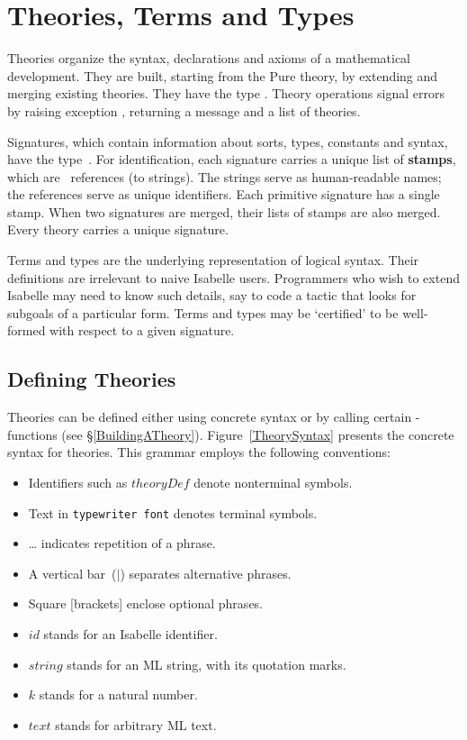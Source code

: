 \chapter{Theories, Terms and Types} \label{theories}
Theories organize the syntax, declarations and axioms of a mathematical
development.  They are built, starting from the Pure theory, by extending
and merging existing theories.  They have the \ML{} type .
Theory operations signal errors by raising exception ,
returning a message and a list of theories.

Signatures, which contain information about sorts, types, constants and
syntax, have the \ML{} type~.  For identification,
each signature carries a unique list of {\bf stamps}, which are~\ML{}
references (to strings).  The strings serve as human-readable names; the
references serve as unique identifiers.  Each primitive signature has a
single stamp.  When two signatures are merged, their lists of stamps are
also merged.  Every theory carries a unique signature.

Terms and types are the underlying representation of logical syntax.  Their
\ML{} definitions are irrelevant to naive Isabelle users.  Programmers who wish
to extend Isabelle may need to know such details, say to code a tactic that
looks for subgoals of a particular form.  Terms and types may be
`certified' to be well-formed with respect to a given signature.

\section{Defining Theories}
\label{DefiningTheories}

Theories can be defined either using concrete syntax or by calling certain
\ML-functions (see \S\ref{BuildingATheory}).  Figure~\ref{TheorySyntax}
presents the concrete syntax for theories.  This grammar employs the
following conventions: 
\begin{itemize}
\item Identifiers such as $theoryDef$ denote nonterminal symbols.
\item Text in {\tt typewriter font} denotes terminal symbols.
\item \ldots{} indicates repetition of a phrase.
\item A vertical bar~($|$) separates alternative phrases.
\item Square [brackets] enclose optional phrases.
\item $id$ stands for an Isabelle identifier.
\item $string$ stands for an ML string, with its quotation marks.
\item $k$ stands for a natural number.
\item $text$ stands for arbitrary ML text.
\end{itemize}

